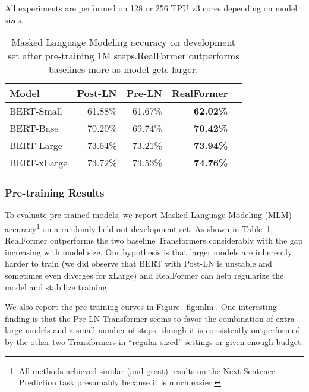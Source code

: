 \documentclass[11pt,a4paper]{article}
\begin{document}
All experiments are performed on 128 or 256 TPU v3 cores depending on model sizes. 


\begin{table}
\setlength{\tabcolsep}{3.5pt}
\centering
\begin{tabular}{lrrrr}
\hline \textbf{Model} & \textbf{Post-LN} & \textbf{Pre-LN} & \textbf{RealFormer} \\ \hline
BERT-Small  & 61.88\%  & 61.67\%   & \textbf{62.02\%}  \\
BERT-Base   & 70.20\%  & 69.74\%   & \textbf{70.42\%}  \\
BERT-Large  & 73.64\%  & 73.21\%   & \textbf{73.94\%}  \\
BERT-xLarge & 73.72\%  & 73.53\%   & \textbf{74.76\%}  \\
\hline
\end{tabular}
\caption{\label{table:bert-mlm} Masked Language Modeling accuracy on development set after pre-training 1M steps.\footnotemark RealFormer outperforms baselines more as model gets larger.}
\end{table}


\subsubsection{Pre-training Results} \label{sec:pre-train}
To evaluate pre-trained models, we report Masked Language Modeling (MLM) accuracy\footnote{All methods achieved similar (and great) results on the Next Sentence Prediction task presumably because it is much easier.} on a randomly held-out development set. As shown in Table~\ref{table:bert-mlm}, RealFormer outperforms the two baseline Transformers considerably with the gap increasing with model size. 
Our hypothesis is that larger models are inherently harder to train (we did observe that BERT with Post-LN is unstable and sometimes even diverges for xLarge) and RealFormer can help regularize the model and stabilize training. 

We also report the pre-training curves in Figure~\ref{fig:mlm}. One interesting finding is that the Pre-LN Transformer seems to favor the combination of extra large models and a small number of steps, though it is consistently outperformed by the other two Transformers in ``regular-sized'' settings or given enough budget. 
\end{document}
